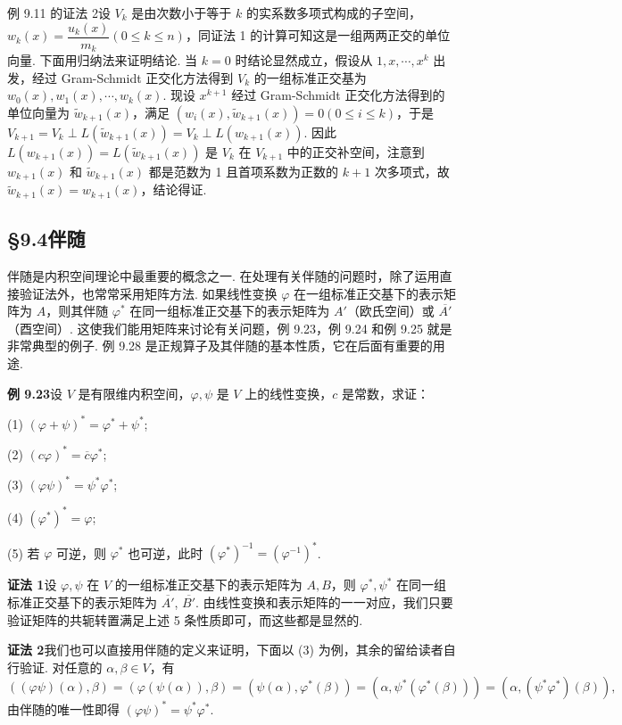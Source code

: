\documentclass[UTF8, 12pt, fontset=fandol, oneside]{ctexart}
\begin{document}
例 9.11 的证法 2\quad 设 $V_k$ 是由次数小于等于 $k$ 的实系数多项式构成的子空间，$w_k(x)=\dfrac{u_k(x)}{m_k}(0\le k\le n)$，同证法 1 的计算可知这是一组两两正交的单位向量. 下面用归纳法来证明结论. 当 $k=0$ 时结论显然成立，假设从 $1,x,\cdots,x^k$ 出发，经过 Gram-Schmidt 正交化方法得到 $V_k$ 的一组标准正交基为 $w_0(x),w_1(x),\cdots,w_k(x)$. 现设 $x^{k+1}$ 经过 Gram-Schmidt 正交化方法得到的单位向量为 $\widetilde{w}_{k+1}(x)$，满足 $(w_i(x),\widetilde{w}_{k+1}(x))=0(0\le i\le k)$，于是 $V_{k+1}=V_k\perp L(\widetilde{w}_{k+1}(x))=V_k\perp L(w_{k+1}(x))$. 因此 $L(w_{k+1}(x))=L(\widetilde{w}_{k+1}(x))$ 是 $V_k$ 在 $V_{k+1}$ 中的正交补空间，注意到 $w_{k+1}(x)$ 和 $\widetilde{w}_{k+1}(x)$ 都是范数为 1 且首项系数为正数的 $k+1$ 次多项式，故 $\widetilde{w}_{k+1}(x)=w_{k+1}(x)$，结论得证.

\subsection*{§9.4\quad 伴随}

伴随是内积空间理论中最重要的概念之一. 在处理有关伴随的问题时，除了运用直接验证法外，也常常采用矩阵方法. 如果线性变换 $\varphi$ 在一组标准正交基下的表示矩阵为 $A$，则其伴随 $\varphi^*$ 在同一组标准正交基下的表示矩阵为 $A'$（欧氏空间）或 $\overline{A'}$（酉空间）. 这使我们能用矩阵来讨论有关问题，例 9.23，例 9.24 和例 9.25 就是非常典型的例子. 例 9.28 是正规算子及其伴随的基本性质，它在后面有重要的用途.

\noindent\textbf{例 9.23}\quad 设 $V$ 是有限维内积空间，$\varphi,\psi$ 是 $V$ 上的线性变换，$c$ 是常数，求证：

(1) $(\varphi+\psi)^*=\varphi^*+\psi^*$;

(2) $(c\varphi)^*=\overline{c}\varphi^*$;

(3) $(\varphi\psi)^*=\psi^*\varphi^*$;

(4) $(\varphi^*)^*=\varphi$;

(5) 若 $\varphi$ 可逆，则 $\varphi^*$ 也可逆，此时 $(\varphi^*)^{-1}=(\varphi^{-1})^*$.

\noindent\textbf{证法 1}\quad 设 $\varphi,\psi$ 在 $V$ 的一组标准正交基下的表示矩阵为 $A,B$，则 $\varphi^*,\psi^*$ 在同一组标准正交基下的表示矩阵为 $\overline{A'}$, $\overline{B'}$. 由线性变换和表示矩阵的一一对应，我们只要验证矩阵的共轭转置满足上述 5 条性质即可，而这些都是显然的.

\noindent\textbf{证法 2}\quad 我们也可以直接用伴随的定义来证明，下面以 (3) 为例，其余的留给读者自行验证. 对任意的 $\alpha,\beta\in V$，有
\[
((\varphi\psi)(\alpha),\beta)=(\varphi(\psi(\alpha)),\beta)
=(\psi(\alpha),\varphi^*(\beta))=(\alpha,\psi^*(\varphi^*(\beta)))
=(\alpha,(\psi^*\varphi^*)(\beta)),
\]
由伴随的唯一性即得 $(\varphi\psi)^*=\psi^*\varphi^*$.
\end{document}
